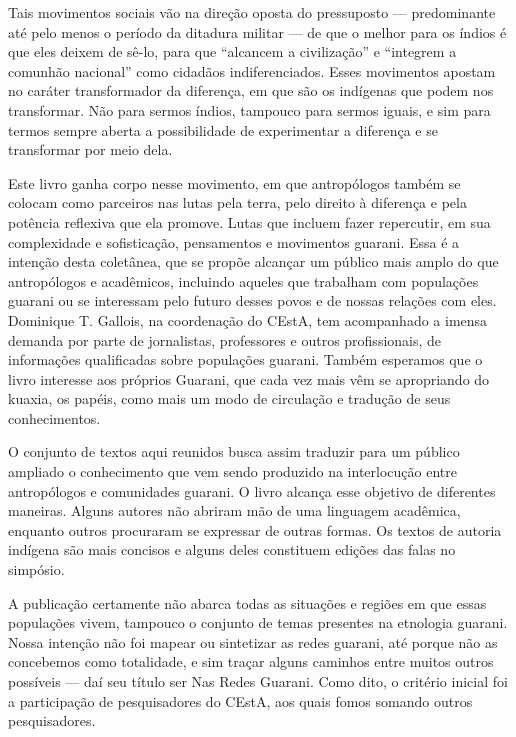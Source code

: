 \documentclass{article}
\begin{document}
Tais movimentos sociais v\~ao na dire\c{c}\~ao oposta do pressuposto ---
predominante at\'e pelo menos o per\'iodo da ditadura militar --- de
que o melhor para os \'indios \'e que eles deixem de s\^e-lo, para que
{\textquotedblleft}alcancem a civiliza\c{c}\~ao{\textquotedblright} e
{\textquotedblleft}integrem a comunh\~ao nacional{\textquotedblright}
como cidad\~aos indiferenciados. Esses movimentos apostam no car\'ater
transformador da diferen\c{c}a, em que s\~ao os ind\'igenas que podem
nos transformar. N\~ao para sermos \'indios, tampouco para sermos
iguais, e sim para termos sempre aberta a possibilidade de experimentar
a diferen\c{c}a e se transformar por meio dela.

Este livro ganha corpo nesse movimento, em que antrop\'ologos tamb\'em
se colocam como parceiros nas lutas pela terra, pelo direito \`a
diferen\c{c}a e pela pot\^encia reflexiva que ela promove. Lutas que
incluem fazer repercutir, em sua complexidade e sofistica\c{c}\~ao,
pensamentos e movimentos guarani. Essa \'e a inten\c{c}\~ao desta
colet\^anea, que se prop\~oe alcan\c{c}ar um p\'ublico mais amplo do
que antrop\'ologos e acad\^emicos, incluindo aqueles que trabalham com
popula\c{c}\~oes guarani ou se interessam pelo futuro desses povos e de
nossas rela\c{c}\~oes com eles. Dominique T. Gallois, na
coordena\c{c}\~ao do CEstA, tem acompanhado a imensa demanda por parte
de jornalistas, professores e outros profissionais, de
informa\c{c}\~oes qualificadas sobre popula\c{c}\~oes guarani. Tamb\'em
esperamos que o livro interesse aos pr\'oprios Guarani, que cada vez
mais v\^em se apropriando do kuaxia, os pap\'eis, como mais um modo de
circula\c{c}\~ao e tradu\c{c}\~ao de seus conhecimentos.

O conjunto de textos aqui reunidos busca assim traduzir para um
p\'ublico ampliado o conhecimento que vem sendo produzido na
interlocu\c{c}\~ao entre antrop\'ologos e comunidades guarani. O livro
alcan\c{c}a esse objetivo de diferentes maneiras. Alguns autores n\~ao
abriram m\~ao de uma linguagem acad\^emica, enquanto outros procuraram
se expressar de outras formas. Os textos de autoria ind\'igena s\~ao
mais concisos e alguns deles constituem edi\c{c}\~oes das falas no
simp\'osio. 

A publica\c{c}\~ao certamente n\~ao abarca todas as situa\c{c}\~oes e
regi\~oes em que essas popula\c{c}\~oes vivem, tampouco o conjunto de
temas presentes na etnologia guarani. Nossa inten\c{c}\~ao n\~ao foi
mapear ou sintetizar as redes guarani, at\'e porque n\~ao as concebemos
como totalidade, e sim tra\c{c}ar alguns caminhos entre muitos outros
poss\'iveis --- da\'i seu t\'itulo ser Nas Redes Guarani. Como dito, o
crit\'erio inicial foi a participa\c{c}\~ao de pesquisadores do CEstA,
aos quais fomos somando outros pesquisadores. 
\end{document}
